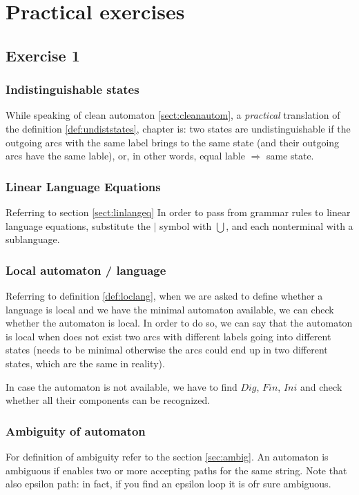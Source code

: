 \chapter{Practical exercises}
    \section{Exercise 1}
        \subsection{Indistinguishable states}
            While speaking of clean automaton \ref{sect:cleanautom}, a \emph{practical} translation of the definition \ref{def:undiststates}, chapter is: two states are 
            undistinguishable if the outgoing arcs with the same label brings to the same state (and their outgoing arcs have the same lable), or, in other words, 
            equal lable $\Rightarrow$ same state.
        \subsection{Linear Language Equations}\label{ese:linlangeq}
            Referring to section \ref{sect:linlangeq}
            In order to pass from grammar rules to linear language equations, substitute the $\vert$ symbol with $\bigcup$, and each nonterminal with a sublanguage.
        \subsection{Local automaton / language}\label{sect:practlocautom}
            Referring to definition \ref{def:loclang}, when we are asked to define whether a language is local and we have the minimal automaton available, we can check 
            whether the automaton is local. In order to do so, we can say that the automaton is local when does not exist two arcs with different labels going into 
            different states (needs to be minimal otherwise the arcs could end up in two different states, which are the same in reality).

            In case the automaton is not available, we have to find $Dig$, $Fin$, $Ini$ and check whether all their components can be recognized.
        \subsection{Ambiguity of automaton}
            For definition of ambiguity refer to the section \ref{sec:ambig}.
            An automaton is ambiguous if enables two or more accepting paths for the same string. Note that also epsilon path: in fact, if you find an epsilon loop
            it is ofr sure ambiguous.